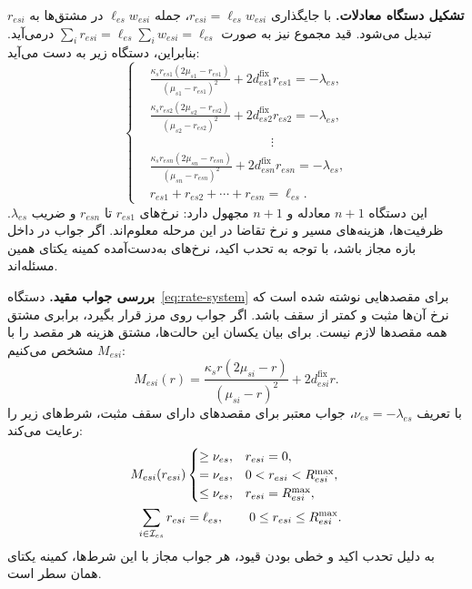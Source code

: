\textbf{تشکیل دستگاه معادلات.}
با جایگذاری $r_{esi}=\ell_{es}w_{esi}$، جمله $\ell_{es}w_{esi}$ در مشتق‌ها به $r_{esi}$ تبدیل می‌شود. قید مجموع نیز به صورت $\sum_i r_{esi}=\ell_{es}\sum_iw_{esi}=\ell_{es}$ درمی‌آید. بنابراین، دستگاه زیر به دست می‌آید:
\begin{equation}
\left\{
\begin{aligned}
 &\frac{\kappa_s r_{es1}(2\mu_{s1}-r_{es1})}
        {(\mu_{s1}-r_{es1})^{2}}
       +2d^{\mathrm{fix}}_{es1}r_{es1}=-\lambda_{es},\\[4pt]
 &\frac{\kappa_s r_{es2}(2\mu_{s2}-r_{es2})}
        {(\mu_{s2}-r_{es2})^{2}}
       +2d^{\mathrm{fix}}_{es2}r_{es2}=-\lambda_{es},\\[2pt]
 &\hspace{4cm}\vdots\\[2pt]
 &\frac{\kappa_s r_{esn}(2\mu_{sn}-r_{esn})}
        {(\mu_{sn}-r_{esn})^{2}}
       +2d^{\mathrm{fix}}_{esn}r_{esn}=-\lambda_{es},\\[4pt]
 &r_{es1}+r_{es2}+\cdots+r_{esn}=\ell_{es}.
\end{aligned}
\right.
 \label{eq:rate-system}
\end{equation}
این دستگاه $n+1$ معادله و $n+1$ مجهول دارد: نرخ‌های $r_{es1}$ تا $r_{esn}$ و ضریب $\lambda_{es}$. ظرفیت‌ها، هزینه‌های مسیر و نرخ تقاضا در این مرحله معلوم‌اند. اگر جواب در داخل بازه مجاز باشد، با توجه به تحدب اکید، نرخ‌های به‌دست‌آمده کمینه یکتای همین مسئله‌اند.

\textbf{بررسی جواب مقید.}
دستگاه~\eqref{eq:rate-system} برای مقصدهایی نوشته شده است که نرخ آن‌ها مثبت و کمتر از سقف باشد. اگر جواب روی مرز قرار بگیرد، برابری مشتق همه مقصدها لازم نیست. برای بیان یکسان این حالت‌ها، مشتق هزینه هر مقصد را با $M_{esi}$ مشخص می‌کنیم:
\begin{equation}
 M_{esi}(r)=
 \frac{\kappa_s r(2\mu_{si}-r)}
      {(\mu_{si}-r)^{2}}
 +2d^{\mathrm{fix}}_{esi}r.
 \label{eq:marginal}
\end{equation}
با تعریف $\nu_{es}=-\lambda_{es}$، جواب معتبر برای مقصدهای دارای سقف مثبت، شرط‌های زیر را رعایت می‌کند:
\begin{equation}
\begin{aligned}
 M_{esi}(r_{esi})&\begin{cases}
 \geq\nu_{es},&r_{esi}=0,\\
 =\nu_{es},&0<r_{esi}<R^{\mathrm{max}}_{esi},\\
 \leq\nu_{es},&r_{esi}=R^{\mathrm{max}}_{esi},
 \end{cases}\\
 \sum_{i\in\mathcal I_{es}}r_{esi}&=\ell_{es},\qquad
 0\leq r_{esi}\leq R^{\mathrm{max}}_{esi}.
\end{aligned}
 \label{eq:optimality-conditions}
\end{equation}
به دلیل تحدب اکید و خطی بودن قیود، هر جواب مجاز با این شرط‌ها، کمینه یکتای همان سطر است.

